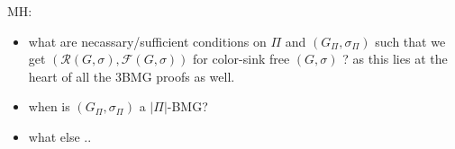 \documentclass[final,3p,times]{elsarticle}
\newcommand{\TODO}[1]{\begingroup\color{red}#1\endgroup}
\begin{document}
\TODO{MH:
\begin{itemize}
\item what are necassary/sufficient conditions on $\Pi$ and $(G_{\Pi},\sigma_{\Pi})$
such that we get $(\mathscr{R}(G,\sigma),\mathscr{F}(G,\sigma))$ for color-sink free $(G,\sigma)$
? as this lies at the heart of all the 3BMG proofs as well. 

\item when is  $(G_{\Pi},\sigma_{\Pi})$ a $|\Pi|$-BMG?

\item what else .. 

\end{itemize}
}



















\end{document}
